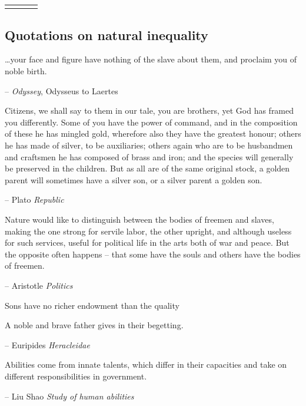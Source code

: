\documentclass[
  12pt,
]{article}
\theoremstyle{definition}
\theoremstyle{definition}
\theoremstyle{definition}
\theoremstyle{definition}
\theoremstyle{remark}
\begin{document}
\begin{table}[ht]
\begin{centerbox}
\begin{threeparttable}
\begin{tabularx}{0.8\textwidth}{p{} p{} p{} p{}}
\hhline{}
\arrayrulecolor{black}
\end{tabularx}
\end{threeparttable}\par\end{centerbox}

\end{table}
 

\FloatBarrier

\clearpage

\subsection{Quotations on natural inequality}\label{quotations-on-natural-inequality}

\ldots your face and figure have nothing of the slave about them, and
proclaim you of noble birth.

-- \emph{Odyssey}, Odysseus to Laertes

Citizens, we shall say to them in our tale, you are brothers, yet God
has framed you differently. Some of you have the power of command, and
in the composition of these he has mingled gold, wherefore also they
have the greatest honour; others he has made of silver, to be
auxiliaries; others again who are to be husbandmen and craftsmen he has
composed of brass and iron; and the species will generally be preserved
in the children. But as all are of the same original stock, a golden
parent will sometimes have a silver son, or a silver parent a golden
son.

-- Plato \emph{Republic}

Nature would like to distinguish between the bodies of freemen and
slaves, making the one strong for servile labor, the other upright, and
although useless for such services, useful for political life in the
arts both of war and peace. But the opposite often happens -- that some
have the souls and others have the bodies of freemen.

-- Aristotle \emph{Politics}

Sons have no richer endowment than the quality

A noble and brave father gives in their begetting.

-- Euripides \emph{Heracleidae}

Abilities come from innate talents, which differ in their capacities and
take on different responsibilities in government.

-- Liu Shao \emph{Study of human abilities}
\end{document}
